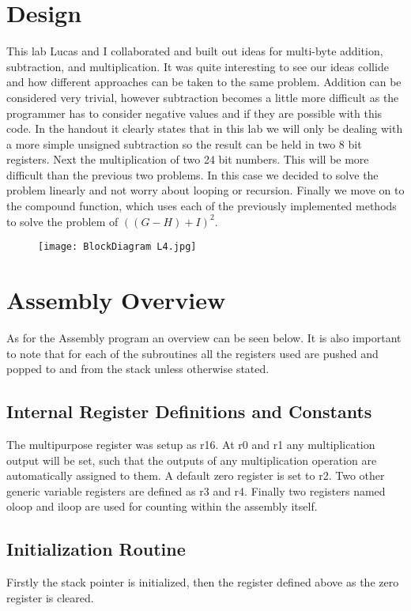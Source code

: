 \documentclass[12pt,letterpaper]{article}
\begin{document}
\section{Design}
This lab Lucas and I collaborated and built out ideas for multi-byte addition, subtraction, and multiplication. It was quite interesting to see our ideas collide and how different approaches can be taken to the same problem. Addition can be considered very trivial, however subtraction becomes a little more difficult as the programmer has to consider negative values and if they are possible with this code. In the handout it clearly states that in this lab we will only be dealing with a more simple unsigned subtraction so the result can be held in two 8 bit registers. Next the multiplication of two 24 bit numbers. This will be more difficult than the previous two problems. In this case we decided to solve the problem linearly and not worry about looping or recursion. Finally we move on to the compound function, which uses each of the previously implemented methods to solve the problem of \(((G-H)+I)^2\). 

\begin{figure}[h]
	\texttt{[image: BlockDiagram L4.jpg]}
	\centering
\end{figure}
	
\section{Assembly Overview}
As for the Assembly program an overview can be seen below. It is also important to note that for each of the subroutines all the registers used are pushed and popped to and from the stack unless otherwise stated.

\subsection{Internal Register Definitions and Constants}
The multipurpose register was setup as r16. At r0 and r1 any multiplication output will be set, such that the outputs of any multiplication operation are automatically assigned to them. A default zero register is set to r2. Two other generic variable registers are defined as r3 and r4. Finally two registers named oloop and iloop are used for counting within the assembly itself.

\subsection{Initialization Routine}
Firstly the stack pointer is initialized, then the register defined above as the zero register is cleared.
\end{document}
